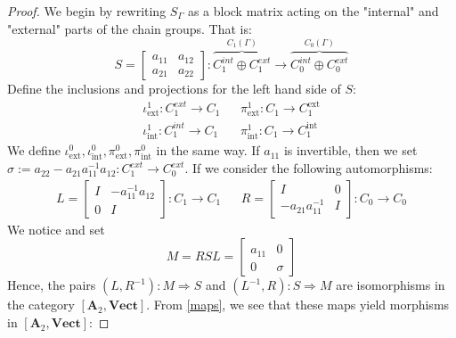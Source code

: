 \documentclass[10pt,a4paper]{amsart}
\begin{document}
\begin{proof}
    We begin by rewriting $S_\Gamma$ as a block matrix acting on the "internal" and "external" parts of the chain groups. That is:
    \begin{equation*}
    S = \begin{bmatrix}
        a_{11} & a_{12} \\
        a_{21} & a_{22}
    \end{bmatrix}
    : \overbrace{C_1^{int} \oplus C_1^{ext}}^{C_1(\Gamma)} \to \overbrace{C_0^{int} \oplus C_0^{ext}}^{C_0(\Gamma)}
    \end{equation*}
    Define the inclusions and projections for the left hand side of $S$:
    \begin{align}\label{maps}
        \iota_{\textrm{ext}}^1:C_1^{ext} \to C_1 && \pi_{\textrm{ext}}^1:C_1 \to C_1 ^{\textrm{ext}} \\
        \iota_{\textrm{int}}^1:C_1^{int} \to C_1 && \pi_{\textrm{int}}^1:C_1 \to C_1 ^{\textrm{int}}
    \end{align}
    We define $\iota_{\textrm{ext}}^0, \iota_{\textrm{int}}^0, \pi_{\textrm{ext}}^0, \pi_{\textrm{int}}^0$ in the same way.
    If $a_{11}$ is invertible, then we set $\sigma:=a_{22} -a_{21}a_{11}^{-1}a_{12} :  C_1^{ext} \to  C_0^{ext}$.
    \newline If we consider the following automorphisms:
    \begin{align*}
        L = \begin{bmatrix}
            I & -a_{11}^{-1}a_{12} \\
            0 & I
            \end{bmatrix}:C_1 \to C_1
            &&
        R = \begin{bmatrix}
            I & 0 \\
            -a_{21}a_{11}^{-1} & I
            \end{bmatrix}:C_0 \to C_0   
    \end{align*}
    We notice and set
    \begin{equation*}
        M= RSL =  \begin{bmatrix}
            a_{11} & 0 \\
            0 & \sigma
            \end{bmatrix}
    \end{equation*} 
    Hence, the pairs $(L,R^{-1}):M \Rightarrow S$ and $(L^{-1},R):S \Rightarrow M$ are isomorphisms in the category $[\mathbf{A}_2, \textbf{Vect}]$. From \eqref{maps}, we see that these maps yield morphisms in $[\mathbf{A}_2, \textbf{Vect}]$:

\end{proof}
\end{document}
